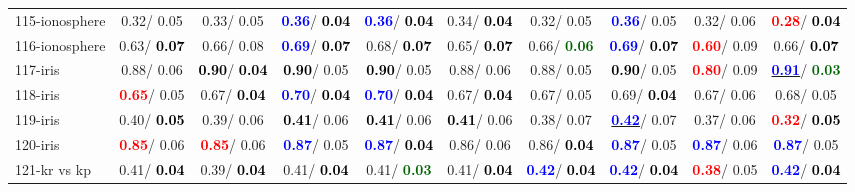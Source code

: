 \begin{table}[h]
\begin{center}
{\begin{tabular}{lc|c|c|c|c|c|c|c|c}
115-ionosphere &   0.32/  0.05 &   0.33/  0.05 & \textcolor{blue}{\textbf{  0.36}}/\textcolor{black}{\textbf{  0.04}} & \textcolor{blue}{\textbf{  0.36}}/\textcolor{black}{\textbf{  0.04}} &   0.34/\textcolor{black}{\textbf{  0.04}} &   0.32/  0.05 & \textcolor{blue}{\textbf{  0.36}}/  0.05 &   0.32/  0.06 & \textcolor{red}{\textbf{  0.28}}/\textcolor{black}{\textbf{  0.04}} \\
116-ionosphere &   0.63/\textcolor{black}{\textbf{  0.07}} &   0.66/  0.08 & \textcolor{blue}{\textbf{  0.69}}/\textcolor{black}{\textbf{  0.07}} &   0.68/\textcolor{black}{\textbf{  0.07}} &   0.65/\textcolor{black}{\textbf{  0.07}} &   0.66/\textcolor{darkgreen}{\textbf{  0.06}} & \textcolor{blue}{\textbf{  0.69}}/\textcolor{black}{\textbf{  0.07}} & \textcolor{red}{\textbf{  0.60}}/  0.09 &   0.66/\textcolor{black}{\textbf{  0.07}} \\
117-iris &   0.88/  0.06 & \textcolor{black}{\textbf{  0.90}}/\textcolor{black}{\textbf{  0.04}} & \textcolor{black}{\textbf{  0.90}}/  0.05 & \textcolor{black}{\textbf{  0.90}}/  0.05 &   0.88/  0.06 &   0.88/  0.05 & \textcolor{black}{\textbf{  0.90}}/  0.05 & \textcolor{red}{\textbf{  0.80}}/  0.09 & \underline{\textcolor{blue}{\textbf{  0.91}}}/\textcolor{darkgreen}{\textbf{  0.03}} \\ \hline
118-iris & \textcolor{red}{\textbf{  0.65}}/  0.05 &   0.67/\textcolor{black}{\textbf{  0.04}} & \textcolor{blue}{\textbf{  0.70}}/\textcolor{black}{\textbf{  0.04}} & \textcolor{blue}{\textbf{  0.70}}/\textcolor{black}{\textbf{  0.04}} &   0.67/\textcolor{black}{\textbf{  0.04}} &   0.67/  0.05 &   0.69/\textcolor{black}{\textbf{  0.04}} &   0.67/  0.06 &   0.68/  0.05 \\
119-iris &   0.40/\textcolor{black}{\textbf{  0.05}} &   0.39/  0.06 & \textcolor{black}{\textbf{  0.41}}/  0.06 & \textcolor{black}{\textbf{  0.41}}/  0.06 & \textcolor{black}{\textbf{  0.41}}/  0.06 &   0.38/  0.07 & \underline{\textcolor{blue}{\textbf{  0.42}}}/  0.07 &   0.37/  0.06 & \textcolor{red}{\textbf{  0.32}}/\textcolor{black}{\textbf{  0.05}} \\
120-iris & \textcolor{red}{\textbf{  0.85}}/  0.06 & \textcolor{red}{\textbf{  0.85}}/  0.06 & \textcolor{blue}{\textbf{  0.87}}/  0.05 & \textcolor{blue}{\textbf{  0.87}}/\textcolor{black}{\textbf{  0.04}} &   0.86/  0.06 &   0.86/\textcolor{black}{\textbf{  0.04}} & \textcolor{blue}{\textbf{  0.87}}/  0.05 & \textcolor{blue}{\textbf{  0.87}}/  0.06 & \textcolor{blue}{\textbf{  0.87}}/  0.05 \\
121-kr vs kp &   0.41/\textcolor{black}{\textbf{  0.04}} &   0.39/\textcolor{black}{\textbf{  0.04}} &   0.41/\textcolor{black}{\textbf{  0.04}} &   0.41/\textcolor{darkgreen}{\textbf{  0.03}} &   0.41/\textcolor{black}{\textbf{  0.04}} & \textcolor{blue}{\textbf{  0.42}}/\textcolor{black}{\textbf{  0.04}} & \textcolor{blue}{\textbf{  0.42}}/\textcolor{black}{\textbf{  0.04}} & \textcolor{red}{\textbf{  0.38}}/  0.05 & \textcolor{blue}{\textbf{  0.42}}/\textcolor{black}{\textbf{  0.04}} \\

\end{tabular}}
\end{center}
\end{table}
